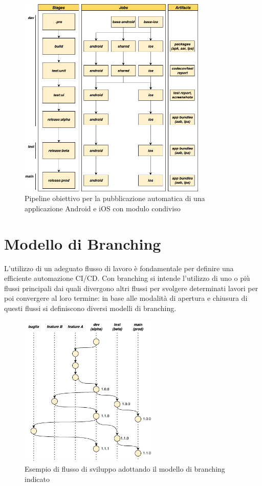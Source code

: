 \begin{figure}[H]
\centering
\includegraphics[width=0.8\textwidth]{img/tesi-11-cicd.drawio.png}
\caption{Pipeline obiettivo per la pubblicazione automatica di una applicazione Android e iOS con modulo condiviso}
\end{figure}

\section{Modello di Branching}
L'utilizzo di un adeguato flusso di lavoro è fondamentale per definire una efficiente automazione CI/CD. Con branching si intende l'utilizzo di uno o più flussi principali dai quali divergono altri flussi per svolgere determinati lavori per poi convergere al loro termine: in base alle modalità di apertura e chiusura di questi flussi si definiscono diversi modelli di branching.

\begin{figure}[H]
\centering
\includegraphics[width=0.6\textwidth]{img/tesi-13-branching.drawio.png}
\caption{Esempio di flusso di sviluppo adottando il modello di branching indicato}
\label{branching}
\end{figure}

